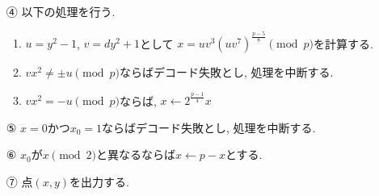 \begin{enumerate}
\begin{enumerate}
    \item[④　] 以下の処理を行う.
    \begin{enumerate}
      \item $u=y^2-1$, $v=dy^2+1$として
      $x=uv^3(uv^7)^{\tfrac{p-5}{8}}\pmod p$を計算する.
      \item $vx^2 \neq \pm  u \pmod p$ならばデコード失敗とし, 処理を中断する.
      \item $vx^2=-u \pmod p$ならば, $x\leftarrow 2^{\tfrac{p-1}{4}}x$
    \end{enumerate}
    \item[⑤　] $x=0$かつ$x_0=1$ならばデコード失敗とし, 処理を中断する.
    \item[⑥　] $x_0$が$x \pmod 2$と異なるならば$x\leftarrow　p-x$とする.
    \item[⑦　] 点$(x,y)$を出力する.
  \end{enumerate}
\end{enumerate}

